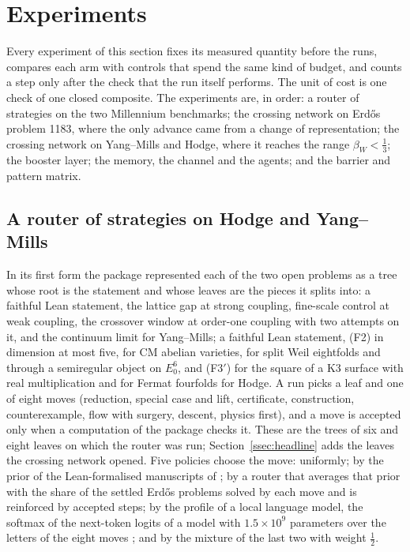 \section{Experiments}\label{sec:experiments}

Every experiment of this section fixes its measured quantity before the runs, compares each arm with controls that spend the same kind of budget, and counts a step only after the check that the run itself performs. The unit of cost is one check of one closed composite. The experiments are, in order: a router of strategies on the two Millennium benchmarks; the crossing network on Erd\H{o}s problem 1183, where the only advance came from a change of representation; the crossing network on Yang--Mills and Hodge, where it reaches the range $\beta_{W}<\frac13$; the booster layer; the memory, the channel and the agents; and the barrier and pattern matrix.

\subsection{A router of strategies on Hodge and Yang--Mills}\label{ssec:router}

In its first form the package represented each of the two open problems as a tree whose root is the statement and whose leaves are the pieces it splits into: a faithful Lean statement, the lattice gap at strong coupling, fine-scale control at weak coupling, the crossover window at order-one coupling with two attempts on it, and the continuum limit for Yang--Mills; a faithful Lean statement, (F2) in dimension at most five, for CM abelian varieties, for split Weil eightfolds and through a semiregular object on $E_{0}^{6}$, and (F3$'$) for the square of a K3 surface with real multiplication and for Fermat fourfolds for Hodge. A run picks a leaf and one of eight moves (reduction, special case and lift, certificate, construction, counterexample, flow with surgery, descent, physics first), and a move is accepted only when a computation of the package checks it. These are the trees of six and eight leaves on which the router was run; Section~\ref{ssec:headline} adds the leaves the crossing network opened. Five policies choose the move: uniformly; by the prior of the Lean-formalised manuscripts of \cite{OAI26b}; by a router that averages that prior with the share of the settled Erd\H{o}s problems solved by each move and is reinforced by accepted steps; by the profile of a local language model, the softmax of the next-token logits of a model with $1.5\times10^{9}$ parameters over the letters of the eight moves \cite{Qwe24}; and by the mixture of the last two with weight $\frac12$.

